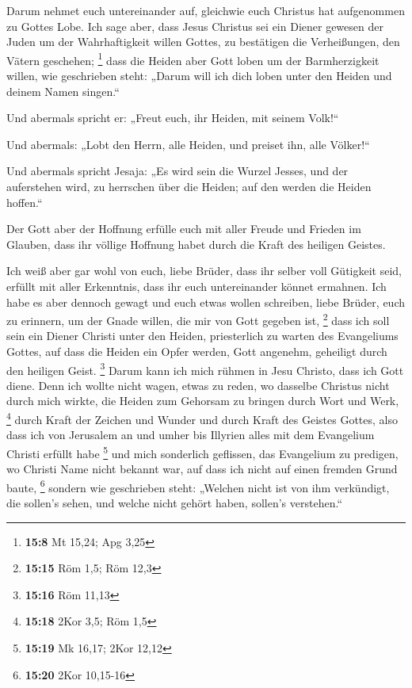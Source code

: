  Darum nehmet euch untereinander auf, gleichwie euch
Christus hat aufgenommen zu Gottes Lobe.  Ich sage aber,
dass Jesus Christus sei ein Diener gewesen der Juden um der
Wahrhaftigkeit willen Gottes, zu bestätigen die Verheißungen, den Vätern
geschehen; \footnote{\textbf{15:8} Mt 15,24; Apg 3,25} 
dass die Heiden aber Gott loben um der Barmherzigkeit willen, wie
geschrieben steht: „Darum will ich dich loben unter den Heiden und
deinem Namen singen.``

 Und abermals spricht er: „Freut euch, ihr Heiden, mit
seinem Volk!{}``

 Und abermals: „Lobt den Herrn, alle Heiden, und preiset
ihn, alle Völker!{}``

 Und abermals spricht Jesaja: „Es wird sein die Wurzel
Jesses, und der auferstehen wird, zu herrschen über die Heiden; auf den
werden die Heiden hoffen.``

 Der Gott aber der Hoffnung erfülle euch mit aller Freude
und Frieden im Glauben, dass ihr völlige Hoffnung habet durch die Kraft
des heiligen Geistes.

 Ich weiß aber gar wohl von euch, liebe Brüder, dass ihr
selber voll Gütigkeit seid, erfüllt mit aller Erkenntnis, dass ihr euch
untereinander könnet ermahnen.  Ich habe es aber dennoch
gewagt und euch etwas wollen schreiben, liebe Brüder, euch zu erinnern,
um der Gnade willen, die mir von Gott gegeben ist, \footnote{\textbf{15:15}
  Röm 1,5; Röm 12,3}  dass ich soll sein ein Diener
Christi unter den Heiden, priesterlich zu warten des Evangeliums Gottes,
auf dass die Heiden ein Opfer werden, Gott angenehm, geheiligt durch den
heiligen Geist. \footnote{\textbf{15:16} Röm 11,13} 
Darum kann ich mich rühmen in Jesu Christo, dass ich Gott diene.
 Denn ich wollte nicht wagen, etwas zu reden, wo dasselbe
Christus nicht durch mich wirkte, die Heiden zum Gehorsam zu bringen
durch Wort und Werk, \footnote{\textbf{15:18} 2Kor 3,5; Röm 1,5}
 durch Kraft der Zeichen und Wunder und durch Kraft des
Geistes Gottes, also dass ich von Jerusalem an und umher bis Illyrien
alles mit dem Evangelium Christi erfüllt habe \footnote{\textbf{15:19}
  Mk 16,17; 2Kor 12,12}  und mich sonderlich geflissen,
das Evangelium zu predigen, wo Christi Name nicht bekannt war, auf dass
ich nicht auf einen fremden Grund baute, \footnote{\textbf{15:20} 2Kor
  10,15-16}  sondern wie geschrieben steht: „Welchen
nicht ist von ihm verkündigt, die sollen's sehen, und welche nicht
gehört haben, sollen's verstehen.``

